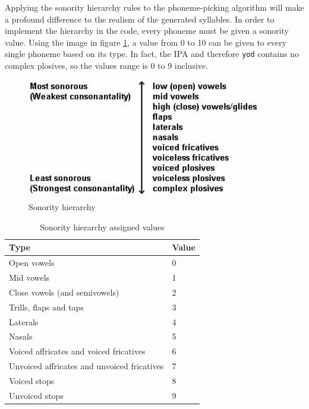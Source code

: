 \documentclass{report}
\begin{document}
	Applying the sonority hierarchy rules to the phoneme-picking algorithm will make a profound difference to the realism of the generated syllables. In order to implement the hierarchy in the code, every phoneme must be given a sonority value. Using the image in figure \ref{sonority hierarchy}, a value from 0 to 10 can be given to every single phoneme based on its type. In fact, the IPA and therefore \texttt{yod} contains no complex plosives, so the values range is 0 to 9 inclusive.
	
	\begin{figure}
		\caption{Sonority hierarchy\cite{glossaryoflinguisticterms}}
		\label{sonority hierarchy}
		\includegraphics[height=150pt]{sonority}
	\end{figure}

	\begin{table}
		\centering
		\caption{Sonority hierarchy assigned values}
		\label{sonority hierarchy assigned values}
		\begin{tabular}{|l|l|}
			\hline
			\cellcolor[HTML]{D8D8D8}Type  & \cellcolor[HTML]{D8D8D8}Value \\
			\hline
			Open vowels                                 & 0     \\
			Mid vowels                                  & 1     \\
			Close vowels (and semivowels)               & 2     \\
			Trills, flaps and taps                      & 3     \\
			Laterals                                    & 4     \\
			Nasals                                      & 5     \\
			Voiced affricates and voiced fricatives     & 6     \\
			Unvoiced affricates and unvoiced fricatives & 7     \\
			Voiced stops                                & 8     \\
			Unvoiced stops                              & 9     \\ \hline
		\end{tabular}
	\end{table}
\end{document}
